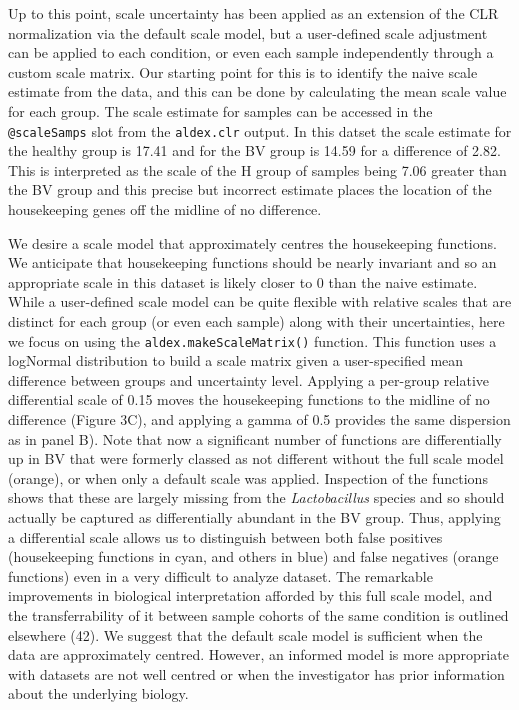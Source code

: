 \documentclass[
]{article}
\begin{document}
Up to this point, scale uncertainty has been applied as an extension of
the CLR normalization via the default scale model, but a user-defined
scale adjustment can be applied to each condition, or even each sample
independently through a custom scale matrix. Our starting point for this
is to identify the naive scale estimate from the data, and this can be
done by calculating the mean scale value for each group. The scale
estimate for samples can be accessed in the \texttt{@scaleSamps} slot
from the \texttt{aldex.clr} output. In this datset the scale estimate
for the healthy group is 17.41 and for the BV group is 14.59 for a
difference of 2.82. This is interpreted as the scale of the H group of
samples being 7.06 greater than the BV group and this precise but
incorrect estimate places the location of the housekeeping genes off the
midline of no difference.

We desire a scale model that approximately centres the housekeeping
functions. We anticipate that housekeeping functions should be nearly
invariant and so an appropriate scale in this dataset is likely closer
to 0 than the naive estimate. While a user-defined scale model can be
quite flexible with relative scales that are distinct for each group (or
even each sample) along with their uncertainties, here we focus on using
the \texttt{aldex.makeScaleMatrix()} function. This function uses a
logNormal distribution to build a scale matrix given a user-specified
mean difference between groups and uncertainty level. Applying a
per-group relative differential scale of 0.15 moves the housekeeping
functions to the midline of no difference (Figure 3C), and applying a
gamma of 0.5 provides the same dispersion as in panel B). Note that now
a significant number of functions are differentially up in BV that were
formerly classed as not different without the full scale model (orange),
or when only a default scale was applied. Inspection of the functions
shows that these are largely missing from the \emph{Lactobacillus}
species and so should actually be captured as differentially abundant in
the BV group. Thus, applying a differential scale allows us to
distinguish between both false positives (housekeeping functions in
cyan, and others in blue) and false negatives (orange functions) even in
a very difficult to analyze dataset. The remarkable improvements in
biological interpretation afforded by this full scale model, and the
transferrability of it between sample cohorts of the same condition is
outlined elsewhere (42). We suggest that the default scale model is
sufficient when the data are approximately centred. However, an informed
model is more appropriate with datasets are not well centred or when the
investigator has prior information about the underlying biology.
\end{document}
